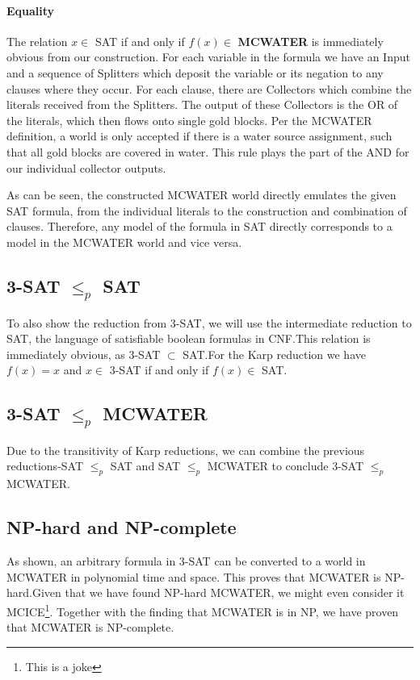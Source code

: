 \pagebreak

\paragraph{Equality}
The relation $x \in$ SAT if and only if $f(x) \in$ \textbf{MCWATER} is immediately obvious from our construction. For each variable in the formula we have an Input and a sequence of Splitters which deposit the variable or its negation to any clauses where they occur. For each clause, there are Collectors which combine the literals received from the Splitters. The output of these Collectors is the OR of the literals, which then flows onto single gold blocks. Per the MCWATER definition, a world is only accepted if there is a water source assignment, such that all gold blocks are covered in water. This rule plays the part of the AND for our individual collector outputs.
\linebreak

\noindent As can be seen, the constructed MCWATER world directly emulates the given SAT formula, from the individual literals to the construction and combination of clauses. Therefore, any model of the formula in SAT directly corresponds to a model in the MCWATER world and vice versa.



\subsection{3-SAT $\leq_p$ SAT}
To also show the reduction from 3-SAT, we will use the intermediate reduction to SAT, the language of satisfiable boolean formulas in CNF.\newline This relation is immediately obvious, as 3-SAT $\subset$ SAT.\newline For the Karp reduction we have $f(x) = x$ and $x \in$ 3-SAT if and only if $f(x) \in$ SAT.



\subsection{3-SAT $\leq_p$ MCWATER}
Due to the transitivity of Karp reductions, we can combine the previous reductions-SAT $\leq_p$ SAT and SAT $\leq_p$ MCWATER to conclude 3-SAT $\leq_p$ MCWATER.



\subsection{NP-hard and NP-complete}
As shown, an arbitrary formula in 3-SAT can be converted to a world in MCWATER in polynomial time and space. This proves that MCWATER is NP-hard.\newline Given that we have found NP-hard MCWATER, we might even consider it MCICE\footnote{This is a joke}.
\linebreak
\noindent Together with the finding that MCWATER is in NP, we have proven that MCWATER is NP-complete.

